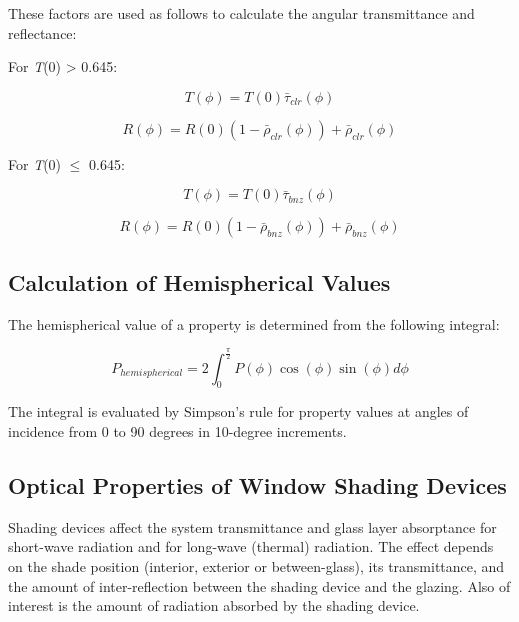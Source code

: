 These factors are used as follows to calculate the angular transmittance and reflectance:

For \emph{T}(0) \textgreater{} 0.645:

\begin{equation}
T(\phi ) = T(0){\bar \tau_{clr}}(\phi )
\end{equation}

\begin{equation}
R(\phi ) = R(0)(1 - {\bar \rho_{clr}}(\phi )) + {\bar \rho_{clr}}(\phi )
\end{equation}

For \emph{T}(0) \(\leq\) 0.645:

\begin{equation}
T(\phi ) = T(0){\bar \tau_{bnz}}(\phi )
\end{equation}

\begin{equation}
R(\phi ) = R(0)(1 - {\bar \rho_{bnz}}(\phi )) + {\bar \rho_{bnz}}(\phi )
\end{equation}

\subsection{Calculation of Hemispherical Values}\label{calculation-of-hemispherical-values}

The hemispherical value of a property is determined from the following integral:

\begin{equation}
{P_{hemispherical}} = 2\int_0^{\frac{\pi }{2}} {P(\phi )\cos (\phi )\sin (\phi )d\phi }
\end{equation}

The integral is evaluated by Simpson's rule for property values at angles of incidence from 0 to 90 degrees in 10-degree increments.

\subsection{Optical Properties of Window Shading Devices}\label{optical-properties-of-window-shading-devices}

Shading devices affect the system transmittance and glass layer absorptance for short-wave radiation and for long-wave (thermal) radiation. The effect depends on the shade position (interior, exterior or between-glass), its transmittance, and the amount of inter-reflection between the shading device and the glazing. Also of interest is the amount of radiation absorbed by the shading device.

